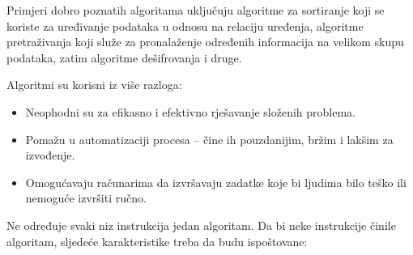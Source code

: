  Primjeri dobro poznatih algoritama uključuju algoritme za sortiranje koji se koriste za uređivanje podataka u odnosu na relaciju  uređenja, algoritme pretraživanja koji služe za pronalaženje određenih informacija na velikom skupu podataka, zatim algoritme dešifrovanja i druge.  %

Algoritmi su korisni iz više razloga:
\begin{itemize}
	\item   Neophodni su za efikasno i efektivno rješavanje složenih problema.
	
	\item  Pomažu u automatizaciji procesa -- čine ih pouzdanijim, bržim i lakšim za izvođenje.
	
	\item  Omogućavaju računarima da izvršavaju zadatke koje bi ljudima bilo teško ili nemoguće izvršiti ručno.
	
\end{itemize}
Ne određuje svaki niz instrukcija jedan algoritam. Da bi neke instrukcije činile algoritam, sljedeće karakteristike treba da budu ispoštovane:

